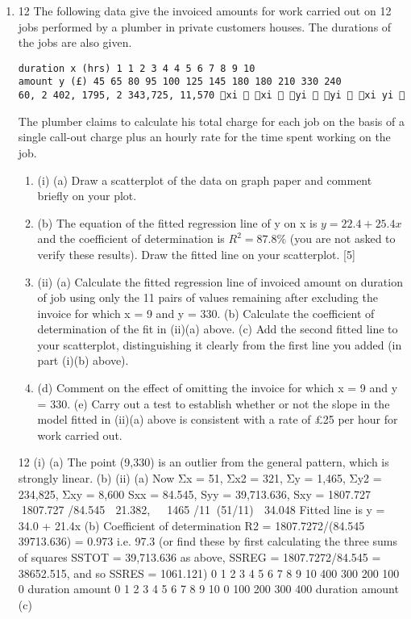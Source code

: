 \documentclass[a4paper,12pt]{article}
\begin{document}
\begin{enumerate}
\item 12 The following data give the invoiced amounts for work carried out on 12 jobs
performed by a plumber in private customers houses. The durations of the jobs are
also given.
\begin{verbatim}
duration x (hrs) 1 1 2 3 4 4 5 6 7 8 9 10
amount y (£) 45 65 80 95 100 125 145 180 180 210 330 240
60, 2 402, 1795, 2 343,725, 11,570 xi  xi  yi  yi  xi yi     
\end{verbatim}

The plumber claims to calculate his total charge for each job on the basis of a single call-out charge plus an hourly rate for the time spent working on the job.
\begin{enumerate}
    \item (i) (a) Draw a scatterplot of the data on graph paper and comment briefly on your plot.
\item (b) The equation of the fitted regression line of y on x is $y = 22.4 + 25.4x$ and the coefficient of determination is $R^2 = 87.8\%$ (you are not asked
to verify these results).
Draw the fitted line on your scatterplot. [5]
\item (ii) (a) Calculate the fitted regression line of invoiced amount on duration of job using only the 11 pairs of values remaining after excluding the
invoice for which x = 9 and y = 330.
(b) Calculate the coefficient of determination of the fit in (ii)(a) above.
(c) Add the second fitted line to your scatterplot, distinguishing it clearly from the first line you added (in part (i)(b) above).
\item (d) Comment on the effect of omitting the invoice for which x = 9 and y = 330.
(e) Carry out a test to establish whether or not the slope in the model fitted in (ii)(a) above is consistent with a rate of £25 per hour for work
carried out.
\end{enumerate}



12 (i) (a)
The point (9,330) is an outlier from the general pattern, which is
strongly linear.
(b)
(ii) (a) Now Σx = 51, Σx2 = 321, Σy = 1,465, Σy2 = 234,825, Σxy = 8,600
Sxx = 84.545, Syy = 39,713.636, Sxy = 1807.727
  1807.727 /84.545  21.382,  1465 /11\beta(51/11)  34.048
Fitted line is y = 34.0 + 21.4x
(b) Coefficient of determination R2 = 1807.7272/(84.545  39713.636)
= 0.973 i.e. 97.3%
(or find these by first calculating the three sums of squares SSTOT
= 39,713.636 as above, SSREG = 1807.7272/84.545 = 38652.515, and
so SSRES = 1061.121)
0 1 2 3 4 5 6 7 8 9 10
400
300
200
100
0
duration
amount
0 1 2 3 4 5 6 7 8 9 10
0
100
200
300
400
duration
amount
(c)


\end{enumerate}
\end{document}
